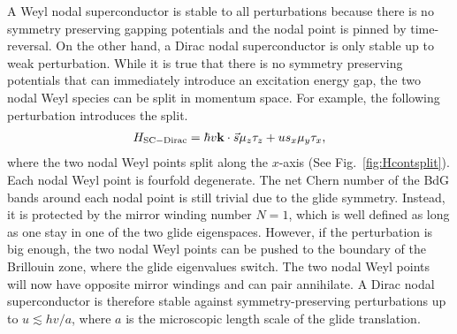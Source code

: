 A Weyl nodal superconductor is stable to all perturbations because there is no symmetry preserving gapping potentials and the nodal point is pinned by time-reversal. On the other hand, a Dirac nodal superconductor is only stable up to weak perturbation. While it is true that there is no symmetry preserving potentials that can immediately introduce an excitation energy gap, the two nodal Weyl species can be split in momentum space. For example, the following perturbation introduces the split. \begin{align}H_{\mathrm{SC-Dirac}}=\hbar v{\bf k}\cdot\vec{s}\mu_z\tau_z+us_x\mu_y\tau_x,\label{DiracSCsplit}\end{align} where the two nodal Weyl points split along the $x$-axis (See Fig.~\ref{fig:Hcontsplit}). Each nodal Weyl point is fourfold degenerate. The net Chern number of the BdG bands around each nodal point is still trivial due to the glide symmetry. Instead, it is protected by the mirror winding number $N=1$, which is well defined as long as one stay in one of the two glide eigenspaces. However, if the perturbation is big enough, the two nodal Weyl points can be pushed to the boundary of the Brillouin zone, where the glide eigenvalues switch. The two nodal Weyl points will now have opposite mirror windings and can pair annihilate. A Dirac nodal superconductor is therefore stable against symmetry-preserving perturbations up to $u\lesssim hv/a$, where $a$ is the microscopic length scale of the glide translation.

